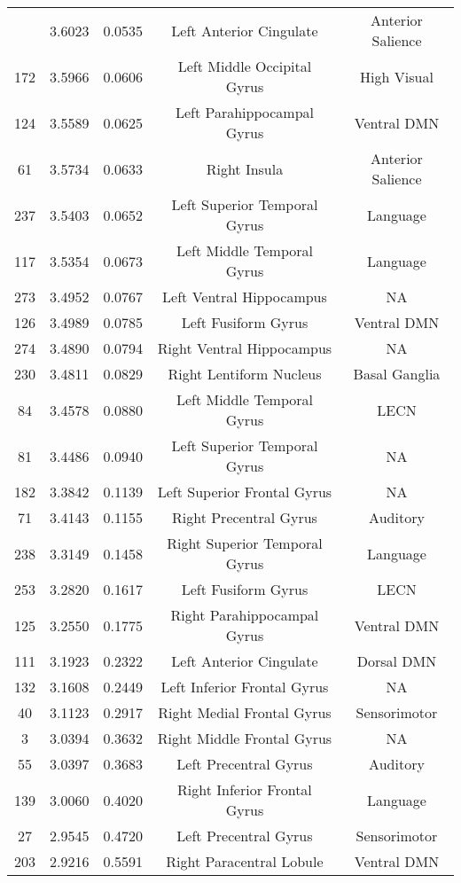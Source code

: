 \documentclass[10pt,letterpaper]{article}\usepackage[]{graphicx}\usepackage[]{color}
\begin{document}
\begin{center}
\begin{longtable}[c]{ccccc}
	\bottomrule
	\endlastfoot
	212 & 3.6023 & 0.0535 & Left Anterior Cingulate & Anterior Salience \\
	172	& 3.5966 & 0.0606 & Left Middle Occipital Gyrus & High Visual \\
	124	& 3.5589 & 0.0625 & Left Parahippocampal Gyrus & Ventral DMN \\
	61	& 3.5734 & 0.0633 & Right Insula & Anterior Salience \\
	237	& 3.5403 & 0.0652 & Left Superior Temporal Gyrus & Language \\
	117	& 3.5354 & 0.0673 & Left Middle Temporal Gyrus & Language \\
	273	& 3.4952 & 0.0767 & Left Ventral Hippocampus & NA \\
	126	& 3.4989 & 0.0785 & Left Fusiform Gyrus & Ventral DMN \\
	274	& 3.4890 & 0.0794 & Right Ventral Hippocampus & NA \\
	230	& 3.4811 & 0.0829 & Right Lentiform Nucleus & Basal Ganglia \\
	84	& 3.4578 & 0.0880 & Left Middle Temporal Gyrus & LECN \\
	81	& 3.4486 & 0.0940 & Left Superior Temporal Gyrus & NA \\
	182	& 3.3842 & 0.1139 & Left Superior Frontal Gyrus & NA \\
	71	& 3.4143 & 0.1155 & Right Precentral Gyrus & Auditory \\
	238	& 3.3149 & 0.1458 & Right Superior Temporal Gyrus & Language \\
	253	& 3.2820 & 0.1617 & Left Fusiform Gyrus & LECN \\
	125	& 3.2550 & 0.1775 & Right Parahippocampal Gyrus & Ventral DMN \\
	111	& 3.1923 & 0.2322 & Left Anterior Cingulate & Dorsal DMN \\
	132	& 3.1608 & 0.2449 & Left Inferior Frontal Gyrus & NA \\
	40	& 3.1123 & 0.2917 & Right Medial Frontal Gyrus & Sensorimotor \\
	3	& 3.0394 & 0.3632 & Right Middle Frontal Gyrus & NA \\
	55	& 3.0397 & 0.3683 & Left Precentral Gyrus & Auditory \\
	139	& 3.0060 & 0.4020 & Right Inferior Frontal Gyrus & Language \\
	27	& 2.9545 & 0.4720 & Left Precentral Gyrus & Sensorimotor \\
	203	& 2.9216 & 0.5591 & Right Paracentral Lobule & Ventral DMN \\

\end{longtable}
\end{center}
\end{document}
